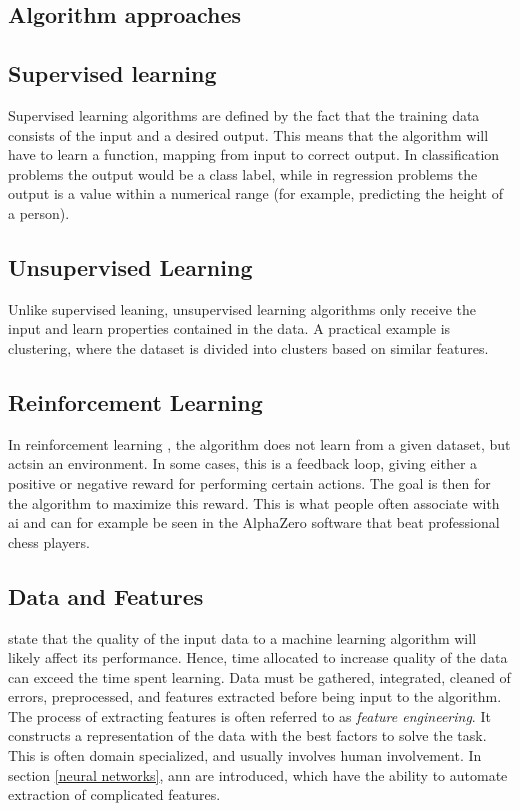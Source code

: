     \subsection{Algorithm approaches} \label{Algorithm types}
        \subsection{Supervised learning}
            Supervised learning \cite{Goodfellow-et-al-2016_E} algorithms are defined by the fact that the training data consists of the input and a desired output. This means that the algorithm will have to learn a function, mapping from input to correct output. In classification problems the output would be a class label, while in regression problems the output is a value within a numerical range (for example, predicting the height of a person).
            
        \subsection{Unsupervised Learning}
            Unlike supervised leaning, unsupervised learning algorithms only receive the input and learn properties contained in the data\cite{Goodfellow-et-al-2016_E}. A practical example is clustering, where the dataset is divided into clusters based on similar features. 
                
        \subsection{Reinforcement Learning}
            In reinforcement learning \cite{Goodfellow-et-al-2016_E}, the algorithm does not learn from a given dataset, but actsin an environment. In some cases, this is a feedback loop, giving either a positive or negative reward for performing certain actions. The goal is then for the algorithm to maximize this reward. This is what people often associate with \gls{ai} and can for example be seen in the AlphaZero software that beat professional chess players\cite{silver2017mastering}.
    
    \subsection{Data and Features}
    \citeauthor{najafabadi2015deep}\cite{najafabadi2015deep} state that the quality of the input data to a machine learning algorithm will likely affect its performance. Hence, time allocated to increase quality of the data can exceed the time spent learning.  Data must be gathered, integrated, cleaned of errors, preprocessed, and features extracted before being input to the algorithm. The process of extracting features is often referred to as \textit{feature engineering}. It constructs a representation of the data with the best factors to solve the task. This is often domain specialized, and usually involves human involvement. In section \ref{neural networks}, \gls{ann} are introduced, which have the ability to automate extraction of complicated features.

